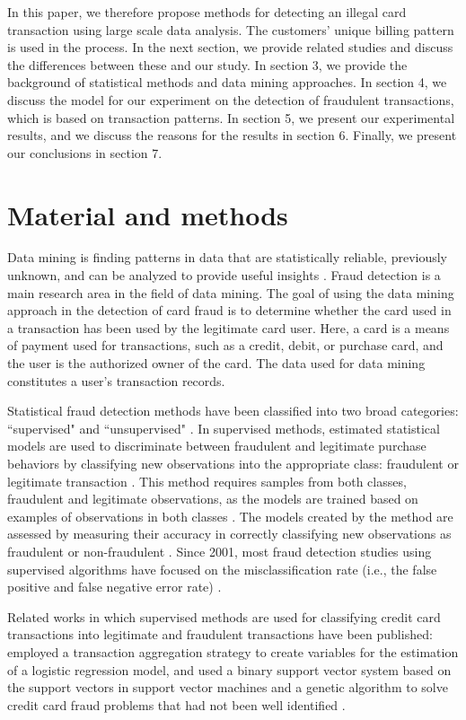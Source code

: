 \documentclass[final,authoryear,5p,times,twocolumn]{elsarticle}
\begin{document}
In this paper, we therefore propose methods for detecting an illegal card transaction using large scale data analysis. The customers' unique billing pattern is used in the process. In the next section, we provide related studies and discuss the differences between these and our study. In section 3, we provide the background of statistical methods and data mining approaches. In section 4, we discuss the model for our experiment on the detection of fraudulent transactions, which is based on transaction patterns. In section 5, we present our experimental results, and we discuss the reasons for the results in section 6. Finally, we present our conclusions in section 7.



\section{Material and methods}
\label{section:Sec2}
Data mining is finding patterns in data that are statistically reliable, previously unknown, and can be analyzed to provide useful insights \citep{ref1}. Fraud detection is a main research area in the field of data mining. The goal of using the data mining approach in the detection of card fraud is to determine whether the card used in a transaction has been used by the legitimate card user. Here, a card is a means of payment used for transactions, such as a credit, debit, or purchase card, and the user is the authorized owner of the card. The data used for data mining constitutes a user's transaction records.

Statistical fraud detection methods have been classified into two broad categories: ``supervised" and ``unsupervised" \citep{ref2, ref3}. In supervised methods, estimated statistical models are used to discriminate between fraudulent and legitimate purchase behaviors by classifying new observations into the appropriate class: fraudulent or legitimate transaction \citep{ref2, ref3}. This method requires samples from both classes, fraudulent and legitimate observations, as the models are trained based on examples of observations in both classes \citep{ref3}. The models created by the method are assessed by measuring their accuracy in correctly classifying new observations as fraudulent or non-fraudulent \citep{ref3}. Since 2001, most fraud detection studies using supervised algorithms have focused on the misclassification rate (i.e., the false positive and false negative error rate) \citep{ref4}.

Related works in which supervised methods are used for classifying credit card transactions into legitimate and fraudulent transactions have been published: \citet{ref3} employed a transaction aggregation strategy to create variables for the estimation of a logistic regression model, and \citet{ref6} used a binary support vector system based on the support vectors in support vector machines and a genetic algorithm to solve credit card fraud problems that had not been well identified \citep{ref5}.
\end{document}
